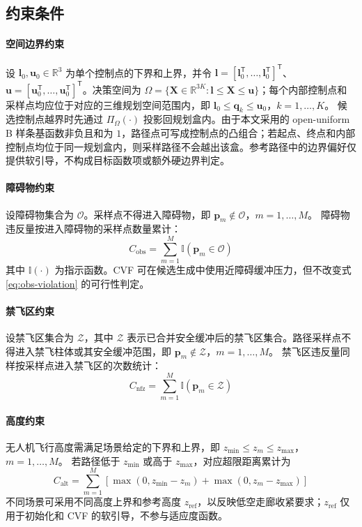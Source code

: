 \subsection{约束条件}

\paragraph{空间边界约束}
设 $\mathbf l_0,\mathbf u_0\in\mathbb R^3$ 为单个控制点的下界和上界，并令 $\mathbf l=[\mathbf l_0^\mathsf T,\ldots,\mathbf l_0^\mathsf T]^\mathsf T$、$\mathbf u=[\mathbf u_0^\mathsf T,\ldots,\mathbf u_0^\mathsf T]^\mathsf T$。决策空间为 $\Omega=\{\mathbf X\in\mathbb R^{3K}:\mathbf l\leq\mathbf X\leq\mathbf u\}$；每个内部控制点和采样点均应位于对应的三维规划空间范围内，即 $\mathbf l_0\leq \mathbf q_k\leq\mathbf u_0$，$k=1,\ldots,K$。
候选控制点越界时先通过 $\Pi_{\Omega}(\cdot)$ 投影回规划盒内。由于本文采用的 open-uniform B 样条基函数非负且和为 $1$，路径点可写成控制点的凸组合；若起点、终点和内部控制点均位于同一规划盒内，则采样路径不会越出该盒。参考路径中的边界偏好仅提供软引导，不构成目标函数项或额外硬边界判定。

\paragraph{障碍物约束}
设障碍物集合为 $\mathcal{O}$。采样点不得进入障碍物，即 $\mathbf{p}_m \notin \mathcal{O}$，$m=1,\ldots,M$。
障碍物违反量按进入障碍物的采样点数量累计：
\begin{equation}
    C_{\mathrm{obs}}=
    \sum_{m=1}^{M}\mathbb{I}(\mathbf p_m\in\mathcal O)
    \label{eq:obs-violation}
\end{equation}
其中 $\mathbb{I}(\cdot)$ 为指示函数。CVF 可在候选生成中使用近障碍缓冲压力，但不改变式 \eqref{eq:obs-violation} 的可行性判定。

\paragraph{禁飞区约束}
设禁飞区集合为 $\mathcal{Z}$，其中 $\mathcal{Z}$ 表示已合并安全缓冲后的禁飞区集合。路径采样点不得进入禁飞柱体或其安全缓冲范围，即 $\mathbf{p}_m \notin \mathcal{Z}$，$m=1,\ldots,M$。
禁飞区违反量同样按采样点进入禁飞区的次数统计：
\begin{equation}
    C_{\mathrm{nfz}}=
    \sum_{m=1}^{M}\mathbb{I}(\mathbf p_m\in\mathcal Z)
    \label{eq:nfz-violation}
\end{equation}

\paragraph{高度约束}
无人机飞行高度需满足场景给定的下界和上界，即 $z_{\min} \leq z_m \leq z_{\max}$，$m=1,\ldots,M$。
若路径低于 $z_{\min}$ 或高于 $z_{\max}$，对应超限距离累计为
\begin{equation}
    C_{\mathrm{alt}}=\sum_{m=1}^{M}
    \left[\max(0,z_{\min}-z_m)+\max(0,z_m-z_{\max})\right]
    \label{eq:altitude-violation}
\end{equation}
不同场景可采用不同高度上界和参考高度 $z_{\mathrm{ref}}$，以反映低空走廊收紧要求；$z_{\mathrm{ref}}$ 仅用于初始化和 CVF 的软引导，不参与适应度函数。

